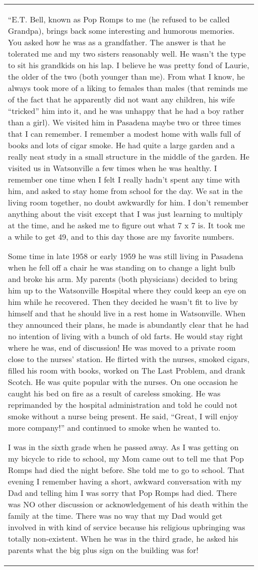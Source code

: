 \documentclass[10pt,letter]{article}
\renewenvironment{quote}
  {\begin{tabular}{|p{13cm}}}
  {\end{tabular}}
\begin{document}
\begin{quote}
``E.T. Bell, known as Pop Romps to me (he refused to be called Grandpa),
brings back some interesting and humorous memories. You asked how he was
as a grandfather. The answer is that he tolerated me and my two sisters
reasonably well. He wasn't the type to sit his grandkids on his lap. I
believe he was pretty fond of Laurie, the older of the two (both younger
than me). From what I know, he always took more of a liking to females
than males (that reminds me of the fact that he apparently did not want
any children, his wife ``tricked'' him into it, and he was unhappy that
he had a boy rather than a girl). We visited him in Pasadena maybe two
or three times that I can remember. I remember a modest home with walls
full of books and lots of cigar smoke. He had quite a large garden and a
really neat study in a small structure in the middle of the garden. He
visited us in Watsonville a few times when he was healthy. I remember
one time when I felt I really hadn't spent any time with him, and asked
to stay home from school for the day. We sat in the living room
together, no doubt awkwardly for him. I don't remember anything about
the visit except that I was just learning to multiply at the time, and
he asked me to figure out what 7 x 7 is. It took me a while to get 49,
and to this day those are my favorite numbers.

Some time in late 1958 or early 1959 he was still living in Pasadena
when he fell off a chair he was standing on to change a light bulb and
broke his arm. My parents (both physicians) decided to bring him up to
the Watsonville Hospital where they could keep an eye on him while he
recovered. Then they decided he wasn't fit to live by himself and that
he should live in a rest home in Watsonville. When they announced their
plans, he made is abundantly clear that he had no intention of living
with a bunch of old farts. He would stay right where he was, end of
discussion! He was moved to a private room close to the nurses' station.
He flirted with the nurses, smoked cigars, filled his room with books,
worked on The Last Problem, and drank Scotch. He was quite popular with
the nurses. On one occasion he caught his bed on fire as a result of
careless smoking. He was reprimanded by the hospital administration and
told he could not smoke without a nurse being present. He said, ``Great,
I will enjoy more company!'' and continued to smoke when he wanted to.

I was in the sixth grade when he passed away. As I was getting on my
bicycle to ride to school, my Mom came out to tell me that Pop Romps had
died the night before. She told me to go to school. That evening I
remember having a short, awkward conversation with my Dad and telling
him I was sorry that Pop Romps had died. There was NO other discussion
or acknowledgement of his death within the family at the time. There was
no way that my Dad would get involved in with kind of service because
his religious upbringing was totally non-existent. When he was in the
third grade, he asked his parents what the big plus sign on the building
was for!


\end{quote}
\end{document}
